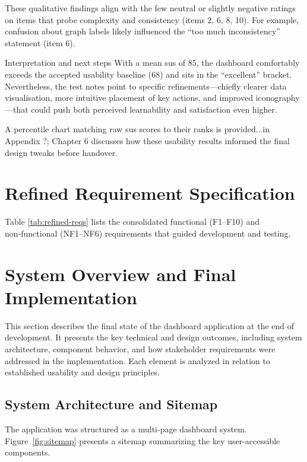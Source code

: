 These qualitative findings align with the few neutral or slightly negative ratings on items that probe complexity and consistency (items 2, 6, 8, 10). For example, confusion about graph labels likely influenced the “too much inconsistency” statement (item 6).

Interpretation and next steps
With a mean \acrshort{sus} of 85, the dashboard comfortably exceeds the accepted usability baseline (68) and sits in the “excellent” bracket. Nevertheless, the test notes point to specific refinements—chiefly clearer data visualisation, more intuitive placement of key actions, and improved iconography—that could push both perceived learnability and satisfaction even higher.

A percentile chart matching raw \acrshort{sus} scores to their ranks is provided...in Appendix ?; Chapter 6 discusses how these usability results informed the final design tweaks before handover.


\section{Refined Requirement Specification}
\label{sec:refined_req_specification}
Table \ref{tab:refined-reqs} lists the consolidated functional (F1–F10)
and non‑functional (NF1–NF6) requirements that guided development and testing.





\section{System Overview and Final Implementation}
\label{sec:system_results}

This section describes the final state of the dashboard application at the end of development. It presents the key technical and design outcomes, including system architecture, component behavior, and how stakeholder requirements were addressed in the implementation. Each element is analyzed in relation to established usability and design principles.

\subsection{System Architecture and Sitemap}
\label{subsec:system_sitemap}

The application was structured as a multi-page dashboard system. Figure~\ref{fig:sitemap} presents a sitemap summarizing the key user-accessible components.


